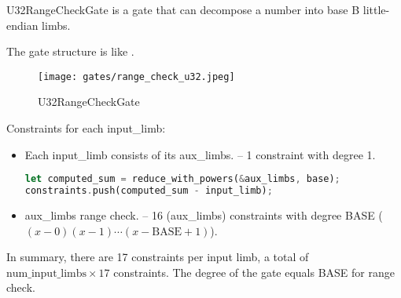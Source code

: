 
\hspace*{\fill}

\indent U32RangeCheckGate is a gate that can decompose a number into base B little-endian limbs.

The gate structure is like .

\begin{figure}[!ht]
    \centering
    \texttt{[image: gates/range\_check\_u32.jpeg]}
    \caption{U32RangeCheckGate}
    \label{fig:range-check-u32}
\end{figure}

Constraints for each input\_limb:
\begin{itemize}
    \item Each input\_limb consists of its aux\_limbs. -- 1 constraint with degree 1.
    \begin{lstlisting}[language=rust]
let computed_sum = reduce_with_powers(&aux_limbs, base);
constraints.push(computed_sum - input_limb);
    \end{lstlisting}
    \item aux\_limbs range check. -- 16 (aux\_limbs) constraints with degree BASE ($(x-0)(x-1)\cdots(x-\text{BASE}+1)$).
\end{itemize}

In summary, there are 17 constraints per input limb, a total of $\text{num\_input\_limbs} \times 17$ constraints. 
The degree of the gate equals BASE for range check.
